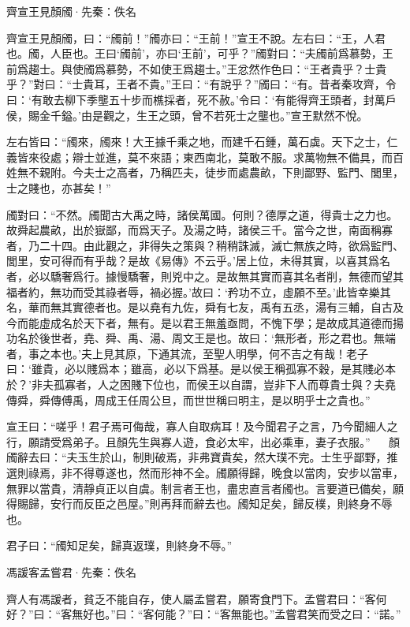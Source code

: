 \documentclass[12pt,a4paper]{ctexbook}
\begin{document}
齊宣王見顏斶·先秦：佚名 \par
齊宣王見顏斶，曰：“斶前！”斶亦曰：“王前！”宣王不說。左右曰：“王，人君也。斶，人臣也。王曰‘斶前’，亦曰‘王前’，可乎？”斶對曰：“夫斶前爲慕勢，王前爲趨士。與使斶爲慕勢，不如使王爲趨士。”王忿然作色曰：“王者貴乎？士貴乎？”對曰：“士貴耳，王者不貴。”王曰：“有說乎？”斶曰：“有。昔者秦攻齊，令曰：‘有敢去柳下季壟五十步而樵採者，死不赦。’令曰：‘有能得齊王頭者，封萬戶侯，賜金千鎰。’由是觀之，生王之頭，曾不若死士之壟也。”宣王默然不悅。\par
左右皆曰：“斶來，斶來！大王據千乘之地，而建千石鍾，萬石虡。天下之士，仁義皆來役處；辯士並進，莫不來語；東西南北，莫敢不服。求萬物無不備具，而百姓無不親附。今夫士之高者，乃稱匹夫，徒步而處農畝，下則鄙野、監門、閭里，士之賤也，亦甚矣！”\par
斶對曰：“不然。斶聞古大禹之時，諸侯萬國。何則？德厚之道，得貴士之力也。故舜起農畝，出於嶽鄙，而爲天子。及湯之時，諸侯三千。當今之世，南面稱寡者，乃二十四。由此觀之，非得失之策與？稍稍誅滅，滅亡無族之時，欲爲監門、閭里，安可得而有乎哉？是故《易傳》不云乎。’居上位，未得其實，以喜其爲名者，必以驕奢爲行。據慢驕奢，則兇中之。是故無其實而喜其名者削，無德而望其福者約，無功而受其祿者辱，禍必握。’故曰：‘矜功不立，虛願不至。’此皆幸樂其名，華而無其實德者也。是以堯有九佐，舜有七友，禹有五丞，湯有三輔，自古及今而能虛成名於天下者，無有。是以君王無羞亟問，不愧下學；是故成其道德而揚功名於後世者，堯、舜、禹、湯、周文王是也。故曰：‘無形者，形之君也。無端者，事之本也。’夫上見其原，下通其流，至聖人明學，何不吉之有哉！老子曰：‘雖貴，必以賤爲本；雖高，必以下爲基。是以侯王稱孤寡不穀，是其賤必本於？’非夫孤寡者，人之困賤下位也，而侯王以自謂，豈非下人而尊貴士與？夫堯傳舜，舜傳傅禹，周成王任周公旦，而世世稱曰明主，是以明乎士之貴也。”\par
宣王曰：“嗟乎！君子焉可侮哉，寡人自取病耳！及今聞君子之言，乃今聞細人之行，願請受爲弟子。且顏先生與寡人遊，食必太牢，出必乘車，妻子衣服。” 　 顏斶辭去曰：“夫玉生於山，制則破焉，非弗寶貴矣，然大璞不完。士生乎鄙野，推選則祿焉，非不得尊遂也，然而形神不全。斶願得歸，晚食以當肉，安步以當車，無罪以當貴，清靜貞正以自虞。制言者王也，盡忠直言者斶也。言要道已備矣，願得賜歸，安行而反臣之邑屋。”則再拜而辭去也。斶知足矣，歸反樸，則終身不辱也。\par
君子曰：“斶知足矣，歸真返璞，則終身不辱。”\par
馮諼客孟嘗君·先秦：佚名 \par
齊人有馮諼者，貧乏不能自存，使人屬孟嘗君，願寄食門下。孟嘗君曰：“客何好？”曰：“客無好也。”曰：“客何能？”曰：“客無能也。”孟嘗君笑而受之曰：“諾。”\par
\end{document}
